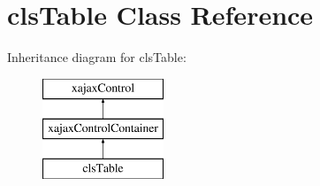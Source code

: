 \hypertarget{classclsTable}{
\section{clsTable Class Reference}
\label{classclsTable}
}
Inheritance diagram for clsTable:\begin{figure}[H]
\begin{center}
\leavevmode
\includegraphics[height=3.000000cm]{classclsTable}
\end{center}
\end{figure}

